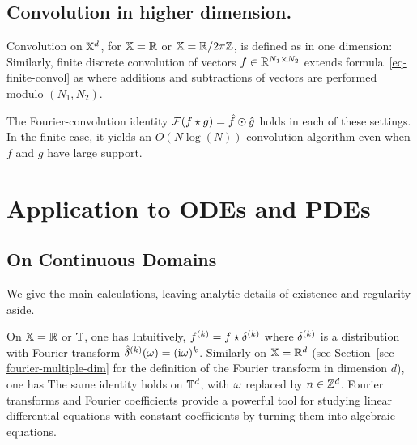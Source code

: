 \subsection{Convolution in higher dimension.}

Convolution on $\mathbb{X}^d$, for $\mathbb{X}=\mathbb{R}$ or $\mathbb{X}=\mathbb{R}/2\pi\mathbb{Z}$, is defined as in one dimension:
Similarly, finite discrete convolution of vectors $f \in \mathbb{R}^{N_1 \times N_2}$ extends formula~\eqref{eq-finite-convol} as
where additions and subtractions of vectors are performed modulo $(N_1,N_2)$.

The Fourier-convolution identity $\mathcal{F}(f \star g)=\hat f \odot \hat g$ holds in each of these settings. In the finite case, it yields an $O(N \log(N))$ convolution algorithm even when $f$ and $g$ have large support.


\section{Application to ODEs and PDEs}
\label{sec-fourier-pdes}

\subsection{On Continuous Domains}

We give the main calculations, leaving analytic details of existence and regularity aside.

On $\mathbb{X}=\mathbb{R}$ or $\mathbb{T}$, one has
Intuitively, $f^{(k)} = f \star \delta^{(k)}$ where $\delta^{(k)}$ is a distribution with Fourier transform $\hat {\delta}^{(k)}(\omega) = (\mathrm{i} \omega)^k$. 
%
Similarly on $\mathbb{X}=\mathbb{R}^d$ (see Section~\ref{sec-fourier-multiple-dim} for the definition of the Fourier transform in dimension $d$), one has
The same identity holds on $\mathbb{T}^d$, with $\omega$ replaced by $n \in \mathbb{Z}^d$.
%
Fourier transforms and Fourier coefficients provide a powerful tool for studying linear differential equations with constant coefficients by turning them into algebraic equations.

